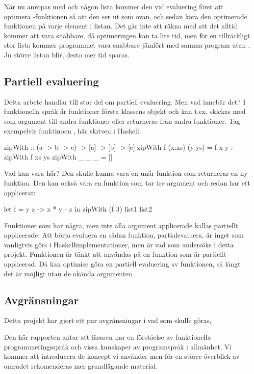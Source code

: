 \documentclass[Rapport]{subfiles}
\begin{document}
När nu  anropas med  och någon lista  kommer
den vid evaluering först att optimera -funktionen så att den
ser ut som  ovan, och sedan köra den optimerade funktionen på varje
element i listan. Det går inte att räkna med att det alltid kommer att vara
snabbare, då optimeringen kan ta lite tid, men för en tillräckligt stor lista 
 kommer programmet vara snabbare jämfört med samma program utan .
Ju större listan  blir, desto mer tid sparas.

\subsection{Partiell evaluering}
Detta arbete handlar till stor del om partiell evaluering. Men vad innebär det?
I funktionella språk är funktioner första klassens objekt och kan t.ex.
skickas med som argument till andra funktioner eller returneras från
andra funktioner. Tag exempelvis funktinoen , här skriven i Haskell:

\begin{codeEx}
zipWith :: (a -> b -> c) -> [a] -> [b] -> [c]
zipWith f (x:xs) (y:ys) = f x y : zipWith f xs ys
zipWith _ _      _      = []
\end{codeEx}

Vad kan  vara här? Den skulle kunna vara en unär funktion som returnerar en ny
funktion. Den kan också vara en funktion som tar tre argument och redan har ett
applicerat:

\begin{codeEx}
let f = \x y z -> x * y - z
in  zipWith (f 3) list1 list2
\end{codeEx}


Funktioner som har några, men inte alla argument applicerade kallas 
partiellt applicerade. Att börja evaluera en sådan funktion, partialevaluera,
är inget som vanligtvis görs i Haskellimplementationer, 
men är vad som undersöks i detta projekt. Funktionen  är
tänkt att användas på en funktion som är partiellt applicerad. Då kan optimise göra en
partiell evaluering av funktionen, så långt det är möjligt utan de okända argumenten.

\subsection{Avgränsningar}
Detta projekt har gjort ett par avgränsningar i vad som skulle göras, 

Den här rapporten antar att läsaren har en förståelse av funktionella programmeringsspråk
och vissa kunskaper av programspråk i allmänhet. Vi kommer att introducera de koncept
vi använder men för en större överblick av området rekomenderas mer grundlägande material.
\end{document}

